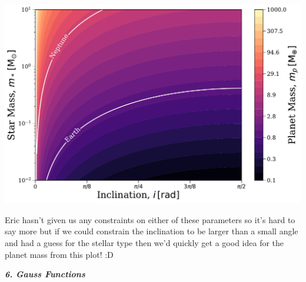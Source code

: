 \documentclass[12pt, letterpaper, twoside]{article}
\newcommand{\question}[1]{{\noindent \it #1}}
\begin{document}
{    \begin{center}
        \includegraphics[width=\textwidth]{figures/planet_mass.pdf}
    \end{center}

    Eric hasn't given us any constraints on either of these parameters so it's hard to say more but if we could constrain the inclination to be larger than a small angle and had a guess for the stellar type then we'd quickly get a good idea for the planet mass from this plot! :D
}

\clearpage

\question{\textbf{6. Gauss Functions}}
\end{document}
